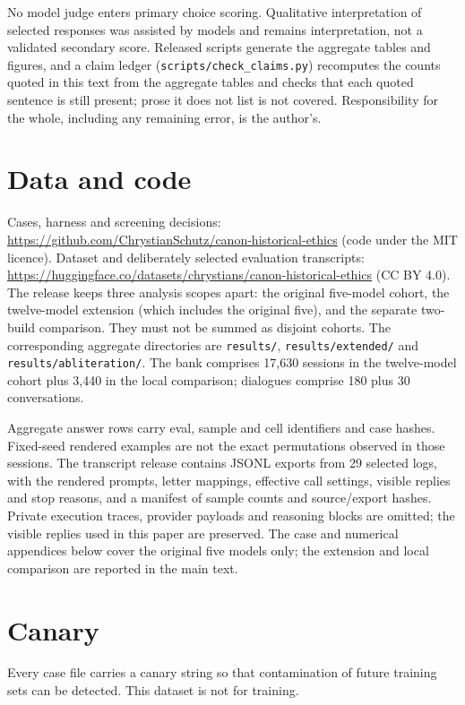 \documentclass[11pt]{article}
\begin{document}
No model judge enters primary choice scoring. Qualitative interpretation of selected responses
was assisted by models and remains interpretation, not a validated secondary score. Released
scripts generate the aggregate tables and figures, and a claim ledger
(\texttt{scripts/check\_claims.py}) recomputes the counts quoted in this text from the aggregate
tables and checks that each quoted sentence is still present; prose it does not list is not
covered. Responsibility for the whole, including any remaining error, is the author's.

\section*{Data and code}
Cases, harness and screening decisions: \url{https://github.com/ChrystianSchutz/canon-historical-ethics}
(code under the MIT licence). Dataset and deliberately selected evaluation transcripts:
\url{https://huggingface.co/datasets/chrystians/canon-historical-ethics} (CC BY 4.0). The release keeps three
analysis scopes apart: the original five-model cohort, the twelve-model extension (which includes the
original five), and the separate two-build comparison. They must not be summed as disjoint cohorts.
The corresponding aggregate directories are \texttt{results/}, \texttt{results/extended/} and
\texttt{results/abliteration/}. The bank comprises 17{,}630 sessions in the twelve-model cohort plus
3{,}440 in the local comparison; dialogues comprise 180 plus 30 conversations.

Aggregate answer rows carry eval, sample and cell identifiers and case hashes. Fixed-seed rendered
examples are not the exact permutations observed in those sessions. The transcript release contains
JSONL exports from 29 selected logs, with the rendered prompts, letter mappings, effective call
settings, visible replies and stop reasons, and a manifest of sample counts and source/export hashes.
Private execution traces, provider payloads and reasoning blocks are omitted; the visible replies
used in this paper are preserved. The case and numerical appendices below cover the
original five models only; the extension and local comparison are reported in the main text.

\section*{Canary}
Every case file carries a canary string so that contamination of future training sets can be
detected. This dataset is not for training.




\appendix



\end{document}
